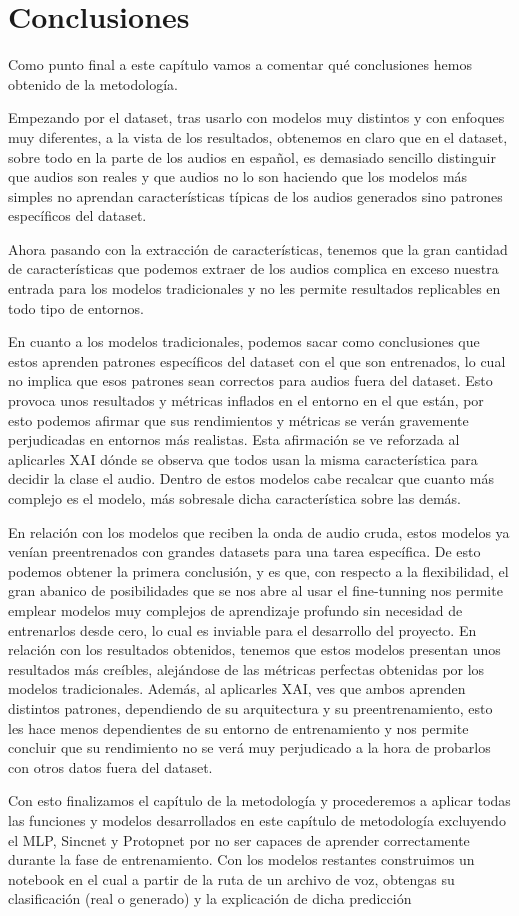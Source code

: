 \section{Conclusiones}
\label{sec:conclusiones_metodologia}

Como punto final a este capítulo vamos a comentar qué conclusiones hemos obtenido de la metodología.

Empezando por el dataset, tras usarlo con modelos muy distintos y con enfoques muy diferentes, a la vista de los resultados, obtenemos en claro que en el dataset, sobre todo en la parte de los audios en español, es demasiado sencillo distinguir que audios son reales y que audios no lo son haciendo que los modelos más simples no aprendan características típicas de los audios generados sino patrones específicos del dataset.

Ahora pasando con la extracción de características, tenemos que la gran cantidad de características que podemos extraer de los audios complica en exceso nuestra entrada para los modelos tradicionales y no les permite resultados replicables en todo tipo de entornos.

En cuanto a los modelos tradicionales, podemos sacar como conclusiones que estos aprenden patrones específicos del dataset con el que son entrenados, lo cual no implica que esos patrones sean correctos para audios fuera del dataset. Esto provoca unos resultados y métricas inflados en el entorno en el que están, por esto podemos afirmar que sus rendimientos y métricas se verán gravemente perjudicadas en entornos más realistas. Esta afirmación se ve reforzada al aplicarles XAI dónde se observa que todos usan la misma característica para decidir la clase el audio. Dentro de estos modelos cabe recalcar que cuanto más complejo es el modelo, más sobresale dicha característica sobre las demás.

En relación con los modelos que reciben la onda de audio cruda, estos modelos ya venían preentrenados con grandes datasets para una tarea específica. De esto podemos obtener la primera conclusión, y es que, con respecto a la flexibilidad, el gran abanico de posibilidades que se nos abre al usar el fine-tunning nos permite emplear modelos muy complejos de aprendizaje profundo sin necesidad de entrenarlos desde cero, lo cual es inviable para el desarrollo del proyecto. En relación con los resultados obtenidos, tenemos que estos modelos presentan unos resultados más creíbles, alejándose de las métricas perfectas obtenidas por los modelos tradicionales. Además, al aplicarles XAI, ves que ambos aprenden distintos patrones, dependiendo de su arquitectura y su preentrenamiento, esto les hace menos dependientes de su entorno de entrenamiento y nos permite concluir que su rendimiento no se verá muy perjudicado a la hora de probarlos con otros datos fuera del dataset.

Con esto finalizamos el capítulo de la metodología y procederemos a aplicar todas las funciones y modelos desarrollados en este capítulo de metodología excluyendo el MLP, Sincnet y Protopnet por no ser capaces de aprender correctamente durante la fase de entrenamiento. Con los modelos restantes construimos un notebook en el cual a partir de la ruta de un archivo de voz, obtengas su clasificación (real o generado) y la explicación de dicha predicción